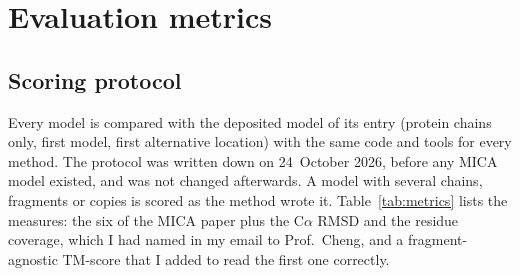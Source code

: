 \section{Evaluation metrics}\label{sec:metrics}

\subsection{Scoring protocol}
Every model is compared with the deposited model of its entry (protein chains only, first model, first alternative location) with the same code and tools for every method. The protocol was written down on 24~October 2026, before any MICA model existed, and was not changed afterwards. A model with several chains, fragments or copies is scored as the method wrote it. Table~\ref{tab:metrics} lists the measures: the six of the MICA paper \citep{gyawali2025mica} plus the C$\alpha$ RMSD and the residue coverage, which I had named in my email to Prof.\ Cheng, and a fragment-agnostic TM-score that I added to read the first one correctly.


